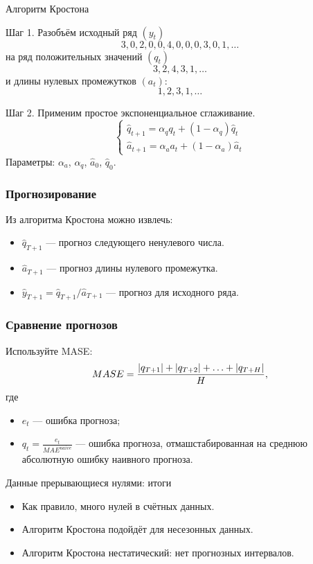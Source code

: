 \begin{frame}{Алгоритм Кростона}
  
  Шаг 1. Разобъём исходный ряд $(y_t)$
  \[
   3, 0, 2, 0, 0, 4, 0, 0, 0, 3, 0, 1, \ldots
  \] \pause
  на ряд \alert{положительных} значений $(q_t)$
  \[
  3, 2, 4, 3, 1, \ldots  
  \]
  и \alert{длины нулевых промежутков} $(a_t)$:
  \[
  1, 2, 3, 1, \ldots   
  \]
  \pause 

  Шаг 2. Применим простое экспоненциальное сглаживание.
  \[
\begin{cases}
  \hat q_{t+1} = \alpha_q q_t + (1-\alpha_q )\hat q_{t} \\
  \hat a_{t+1} = \alpha_a a_t + (1-\alpha_a )\hat a_{t}
\end{cases}
  \]
  \pause 
  Параметры: $\alpha_a$, $\alpha_q$, $\hat a_{0}$, $\hat q_{0}$.


\end{frame}
  

\begin{frame}
  \frametitle{Прогнозирование}

  Из алгоритма Кростона можно извлечь:
  \begin{itemize}[<+->]
    \item $\hat q_{T+1}$ — прогноз следующего ненулевого числа. 
    \item $\hat a_{T+1}$ — прогноз длины нулевого промежутка. 
    \item $\hat y_{T+1} = \hat q_{T+1} / \hat a_{T+1}$ — прогноз для исходного ряда. 
  \end{itemize}
  
\end{frame}

\begin{frame}
  \frametitle{Сравнение прогнозов}

  Используйте \alert{MASE}:
    \[
      MASE  = \frac{\abs {q_{T+1}} + \abs{q_{T+2}}+ \ldots + \abs{q_{T+H}} }{H},
  \]  
  где 
  \begin{itemize}
    \item $e_t$ — ошибка прогноза;
    \item $q_t = \frac{e_t}{MAE^{naive}}$ — ошибка прогноза,
    отмашстабированная на среднюю абсолютную ошибку наивного прогноза. 
  \end{itemize}
\end{frame}


\begin{frame}{Данные прерывающиеся нулями: итоги}

  \begin{itemize}[<+->]
    \item Как правило, много нулей в \alert{счётных} данных.
    \item Алгоритм Кростона подойдёт для \alert{несезонных} данных. 
    \item Алгоритм Кростона \alert{нестатический}: нет прогнозных интервалов. 
  \end{itemize}
\end{frame}

